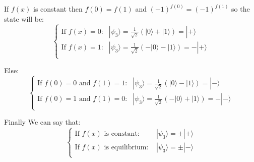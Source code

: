 \documentclass{article}
\begin{document}
If $f(x)$ is constant then $f(0) = f(1)$ and $(-1)^{f(0)} = (-1)^{f(1)}$ so the state will be:
\begin{equation}
    \begin{cases}
        \text{If $f(x) = 0$:} & |\psi_3\rangle = \frac{1}{\sqrt{2}}(|0\rangle + |1\rangle) = |+\rangle \\
        \text{If $f(x) = 1$:} & |\psi_3\rangle = \frac{1}{\sqrt{2}}(-|0\rangle - |1\rangle) = -|+\rangle \\
    \end{cases}
\end{equation}

Else:
\begin{equation}
    \begin{cases}
        \text{If $f(0) = 0$ and $f(1) = 1$:} & |\psi_3\rangle = \frac{1}{\sqrt{2}}(|0\rangle - |1\rangle) = |-\rangle \\
        \text{If $f(0) = 1$ and $f(1) = 0$:} & |\psi_3\rangle = \frac{1}{\sqrt{2}}(-|0\rangle + |1\rangle) = -|-\rangle \\
    \end{cases}
\end{equation}

Finally We can say that:
\begin{equation}
    \begin{cases}
        \text{If $f(x)$ is constant: } & |\psi_3\rangle = \pm|+\rangle \\
        \text{If $f(x)$ is equilibrium: } & |\psi_3\rangle = \pm|-\rangle \\
    \end{cases}
\end{equation}
\end{document}
